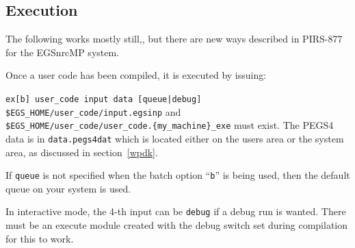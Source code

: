 %



\subsection{Execution}
\label{Execution}

The following works mostly still,, but there are new ways described in
PIRS-877\cite{Ka03} for the EGSnrcMP system.


Once a user code has been compiled, it is executed by issuing:

\hspace*{1cm}\verb+ex[b] user_code input data [queue|debug]+\vspace*{5mm}\\
\verb+$EGS_HOME/user_code/input.egsinp+ and\\
\verb+$EGS_HOME/user_code/user_code.{my_machine}_exe+ must exist.  The
PEGS4 data is in \verb+data.pegs4dat+ which is located either on
the users area or the system area, as discussed in section~\ref{wpdk}.

If \verb+queue+ is not specified when the batch option ``{\tt b}'' is being
used, then the default queue on your system is used.

In interactive mode, the 4-th input can be \verb+debug+ if a debug run
is wanted.  There must be an execute module created with the debug
switch set during compilation for this to work.

